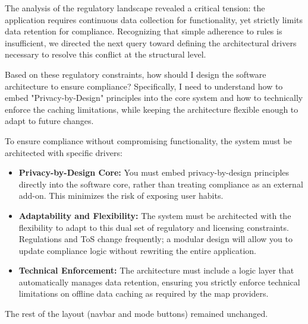 \vspace{0.5cm}

\noindent
The analysis of the regulatory landscape revealed a critical tension: the application requires continuous data collection for functionality, yet strictly limits data retention for compliance. Recognizing that simple adherence to rules is insufficient, we directed the next query toward defining the architectural drivers necessary to resolve this conflict at the structural level.

\vspace{0.3cm}
\newpage
\begin{PromptBox}
\quad Based on these regulatory constraints, how should I design the software architecture to ensure compliance? Specifically, I need to understand how to embed "Privacy-by-Design" principles into the core system and how to technically enforce the caching limitations, while keeping the architecture flexible enough to adapt to future changes.

\vspace{0.3cm}
\end{PromptBox}


\begin{ChatGPTGood}
\quad To ensure compliance without compromising functionality, the system must be architected with specific drivers:
\begin{itemize} \item \textbf{Privacy-by-Design Core:} You must embed privacy-by-design principles directly into the software core, rather than treating compliance as an external add-on. This minimizes the risk of exposing user habits. \item \textbf{Adaptability and Flexibility:} The system must be architected with the flexibility to adapt to this dual set of regulatory and licensing constraints. Regulations and ToS change frequently; a modular design will allow you to update compliance logic without rewriting the entire application.\item \textbf{Technical Enforcement:} The architecture must include a logic layer that automatically manages data retention, ensuring you strictly enforce technical limitations on offline data caching as required by the map providers.\end{itemize} The rest of the layout (navbar and mode buttons) remained unchanged.
    
\vspace{0.3cm}

\end{ChatGPTGood}


